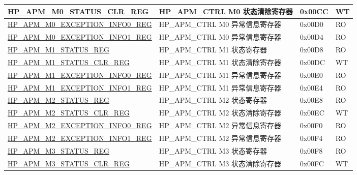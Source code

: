 \begin{longtable}{ | L{6.5cm} | l | l | l | }
\hyperref[regdesc:HPAPMM0STATUSCLRREG]{HP\_APM\_M0\_STATUS\_CLR\_REG} & HP\_APM\_CTRL M0 状态清除寄存器 & 0x00CC & WT \\ \hline

\hyperref[regdesc:HPAPMM0EXCEPTIONINFO0REG]{HP\_APM\_M0\_EXCEPTION\_INFO0\_REG} & HP\_APM\_CTRL M0 异常信息寄存器 & 0x00D0 & RO \\ \hline

\hyperref[regdesc:HPAPMM0EXCEPTIONINFO1REG]{HP\_APM\_M0\_EXCEPTION\_INFO1\_REG} & HP\_APM\_CTRL M0 异常信息寄存器 & 0x00D4 & RO \\ \hline

\hyperref[regdesc:HPAPMM1STATUSREG]{HP\_APM\_M1\_STATUS\_REG} & HP\_APM\_CTRL M1 状态寄存器 & 0x00D8 & RO \\ \hline

\hyperref[regdesc:HPAPMM1STATUSCLRREG]{HP\_APM\_M1\_STATUS\_CLR\_REG} & HP\_APM\_CTRL M1 状态清除寄存器 & 0x00DC & WT \\ \hline

\hyperref[regdesc:HPAPMM1EXCEPTIONINFO0REG]{HP\_APM\_M1\_EXCEPTION\_INFO0\_REG} & HP\_APM\_CTRL M1 异常信息寄存器 & 0x00E0 & RO \\ \hline

\hyperref[regdesc:HPAPMM1EXCEPTIONINFO1REG]{HP\_APM\_M1\_EXCEPTION\_INFO1\_REG} & HP\_APM\_CTRL M1 异常信息寄存器 & 0x00E4 & RO \\ \hline

\hyperref[regdesc:HPAPMM2STATUSREG]{HP\_APM\_M2\_STATUS\_REG} & HP\_APM\_CTRL M2 状态寄存器 & 0x00E8 & RO \\ \hline

\hyperref[regdesc:HPAPMM2STATUSCLRREG]{HP\_APM\_M2\_STATUS\_CLR\_REG} & HP\_APM\_CTRL M2 状态清除寄存器 & 0x00EC & WT \\ \hline

\hyperref[regdesc:HPAPMM2EXCEPTIONINFO0REG]{HP\_APM\_M2\_EXCEPTION\_INFO0\_REG} & HP\_APM\_CTRL M2 异常信息寄存器 & 0x00F0 & RO \\ \hline

\hyperref[regdesc:HPAPMM2EXCEPTIONINFO1REG]{HP\_APM\_M2\_EXCEPTION\_INFO1\_REG} & HP\_APM\_CTRL M2 异常信息寄存器 & 0x00F4 & RO \\ \hline

\hyperref[regdesc:HPAPMM3STATUSREG]{HP\_APM\_M3\_STATUS\_REG} & HP\_APM\_CTRL M3 状态寄存器 & 0x00F8 & RO \\ \hline

\hyperref[regdesc:HPAPMM3STATUSCLRREG]{HP\_APM\_M3\_STATUS\_CLR\_REG} & HP\_APM\_CTRL M3 状态清除寄存器 & 0x00FC & WT \\ \hline


\end{longtable}
